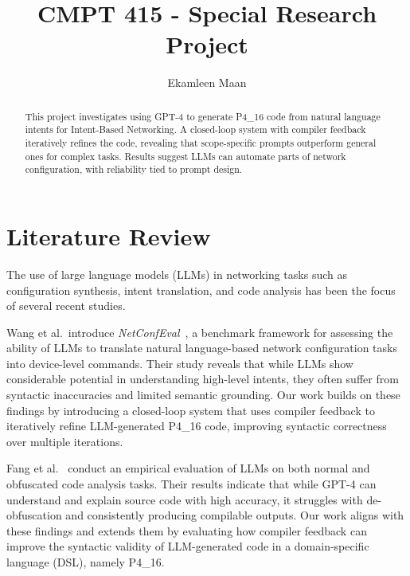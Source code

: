 \documentclass[sigconf]{acmart}
\begin{document}
\fancyhead{}
\title{CMPT 415 - Special Research Project}
\author{Ekamleen Maan}


\begin{abstract}
This project investigates using GPT-4 to generate P4\_16 code from natural language intents for Intent-Based Networking. A closed-loop system with compiler feedback iteratively refines the code, revealing that scope-specific prompts outperform general ones for complex tasks. Results suggest LLMs can automate parts of network configuration, with reliability tied to prompt design.
\end{abstract}



\maketitle
\section{Literature Review}

The use of large language models (LLMs) in networking tasks such as configuration synthesis, intent translation, and code analysis has been the focus of several recent studies.

Wang et al.\ introduce \textit{NetConfEval}~\cite{wang2023netconfeval}, a benchmark framework for assessing the ability of LLMs to translate natural language-based network configuration tasks into device-level commands. Their study reveals that while LLMs show considerable potential in understanding high-level intents, they often suffer from syntactic inaccuracies and limited semantic grounding. Our work builds on these findings by introducing a closed-loop system that uses compiler feedback to iteratively refine LLM-generated P4\_16 code, improving syntactic correctness over multiple iterations.

Fang et al.~\cite{fang2024codeanalysis} conduct an empirical evaluation of LLMs on both normal and obfuscated code analysis tasks. Their results indicate that while GPT-4 can understand and explain source code with high accuracy, it struggles with de-obfuscation and consistently producing compilable outputs. Our work aligns with these findings and extends them by evaluating how compiler feedback can improve the syntactic validity of LLM-generated code in a domain-specific language (DSL), namely P4\_16.
\end{document}
